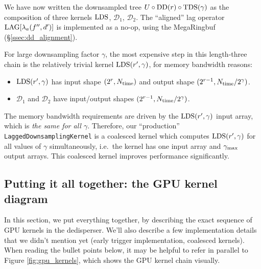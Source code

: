 \documentclass{article}
\numberwithin{equation}{section}   %
\def\DD{{\rm DD}}
\def\TDS{{\rm TDS}}
\def\LDS{{\rm LDS}}
\def\LAG{{\rm LAG}}
\begin{document}
We have now written the downsampled tree $U \circ \DD(r) \circ \TDS(\gamma)$ as the
composition of three kernels $\LDS$, ${\mathcal D}_1$, ${\mathcal D}_2$.
The ``aligned'' lag operator $\LAG[\lambda_a(f'',d')]$ is implemented as a
no-op, using the MegaRingbuf (\S\ref{ssec:dd_alignment}).

For large downsampling factor $\gamma$, the most expensive step in this length-three
chain is the relatively trivial kernel $\LDS(r',\gamma)$, for memory bandwidth reasons:
\begin{itemize}
\item $\LDS(r',\gamma)$ has input shape $(2^r, N_{\rm time})$ and output shape $(2^{r-1}, N_{\rm time}/2^\gamma)$.
\item ${\mathcal D}_1$ and ${\mathcal D}_2$ have input/output shapes $(2^{r-1}, N_{\rm time}/2^\gamma)$.
\end{itemize}
The memory bandwidth requirements are driven by the $\LDS(r',\gamma)$ input array, which
is {\em the same for all $\gamma$}.
Therefore, our ``production'' {\tt LaggedDownsamplingKernel} is a coalesced kernel
which computes $\LDS(r',\gamma)$ for all values of $\gamma$ simultaneously, i.e.\ the
kernel has one input array and $\gamma_{\rm max}$ output arrays.
This coalesced kernel improves performance significantly.

\subsection{Putting it all together: the GPU kernel diagram}
\label{ssec:gpu_kernel_diagram}

In this section, we put everything together, by describing the exact sequence
of GPU kernels in the dedisperser.
We'll also describe a few implementation details that we didn't mention yet
(early trigger implementation, coalesced kernels).
When reading the bullet points below, it may be helpful to refer in parallel
to Figure \ref{fig:gpu_kernels}, which shows the GPU kernel chain visually.
\end{document}
